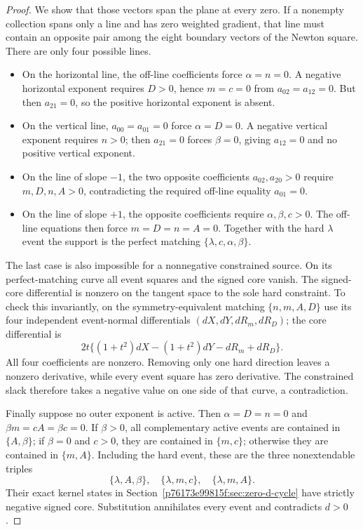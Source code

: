 \begin{proof}
We show that those vectors span the plane at every zero. If a nonempty collection spans only a line and has zero weighted gradient, that line must contain an opposite pair among the eight boundary vectors of the Newton square. There are only four possible lines.
\begin{itemize}
\item On the horizontal line, the off-line coefficients force $\alpha=n=0$. A negative horizontal exponent requires $D>0$, hence $m=c=0$ from $a_{02}=a_{12}=0$. But then $a_{21}=0$, so the positive horizontal exponent is absent.
\item On the vertical line, $a_{00}=a_{01}=0$ force $\alpha=D=0$. A negative vertical exponent requires $n>0$; then $a_{21}=0$ forces $\beta=0$, giving $a_{12}=0$ and no positive vertical exponent.
\item On the line of slope $-1$, the two opposite coefficients $a_{02},a_{20}>0$ require $m,D,n,A>0$, contradicting the required off-line equality $a_{01}=0$.
\item On the line of slope $+1$, the opposite coefficients require $\alpha,\beta,c>0$. The off-line equations then force $m=D=n=A=0$. Together with the hard $\lambda$ event the support is the perfect matching $\{\lambda,c,\alpha,\beta\}$.
\end{itemize}
The last case is also impossible for a nonnegative constrained source. On its perfect-matching curve all event squares and the signed core vanish. The signed-core differential is nonzero on the tangent space to the sole hard constraint. To check this invariantly, on the symmetry-equivalent matching $\{n,m,A,D\}$ use its four independent event-normal differentials $(dX,dY,dR_m,dR_D)$; the core differential is
\[
2t\{(1+t^2)dX-(1+t^2)dY-dR_m+dR_D\}.
\]
All four coefficients are nonzero. Removing only one hard direction leaves a nonzero derivative, while every event square has zero derivative. The constrained slack therefore takes a negative value on one side of that curve, a contradiction.

Finally suppose no outer exponent is active. Then $\alpha=D=n=0$ and
$\beta m=cA=\beta c=0$. If $\beta>0$, all complementary active events are contained in $\{A,\beta\}$; if $\beta=0$ and $c>0$, they are contained in $\{m,c\}$; otherwise they are contained in $\{m,A\}$. Including the hard event, these are the three nonextendable triples
\[
\{\lambda,A,\beta\},\quad \{\lambda,m,c\},\quad \{\lambda,m,A\}.
\]
Their exact kernel states in Section~\ref{p76173e99815f:sec:zero-d-cycle} have strictly negative signed core. Substitution annihilates every event and contradicts $d>0$.


\end{proof}
